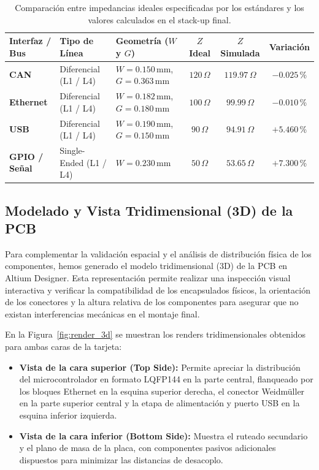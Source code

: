 \documentclass[12pt,a4paper]{article}
\begin{document}
\begin{table}[H]
\centering
\small
\begin{tabularx}{\textwidth}{|l|l|X|c|c|c|}
\hline
\textbf{Interfaz / Bus} & \textbf{Tipo de Línea} & \textbf{Geometría ($W$ y $G$)} & \textbf{$Z$ Ideal} & \textbf{$Z$ Simulada} & \textbf{Variación} \\ \hline
\textbf{CAN} & Diferencial (L1 / L4) & $W=0.150\,\text{mm}$, $G=0.363\,\text{mm}$ & $120\,\Omega$ & $119.97\,\Omega$ & $-0.025$\,\% \\ \hline
\textbf{Ethernet} & Diferencial (L1 / L4) & $W=0.182\,\text{mm}$, $G=0.180\,\text{mm}$ & $100\,\Omega$ & $99.99\,\Omega$ & $-0.010$\,\% \\ \hline
\textbf{USB} & Diferencial (L1 / L4) & $W=0.190\,\text{mm}$, $G=0.150\,\text{mm}$ & $90\,\Omega$ & $94.91\,\Omega$ & $+5.460$\,\% \\ \hline
\textbf{GPIO / Señal} & Single-Ended (L1 / L4) & $W=0.230\,\text{mm}$ & $50\,\Omega$ & $53.65\,\Omega$ & $+7.300$\,\% \\ \hline
\end{tabularx}
\caption{Comparación entre impedancias ideales especificadas por los estándares y los valores calculados en el stack-up final.}
\label{tab:impedancias}
\end{table}

\subsection{Modelado y Vista Tridimensional (3D) de la PCB}

Para complementar la validación espacial y el análisis de distribución física de los componentes, hemos generado el modelo tridimensional (3D) de la PCB en Altium Designer. Esta representación permite realizar una inspección visual interactiva y verificar la compatibilidad de los encapsulados físicos, la orientación de los conectores y la altura relativa de los componentes para asegurar que no existan interferencias mecánicas en el montaje final.

En la Figura~\ref{fig:render_3d} se muestran los renders tridimensionales obtenidos para ambas caras de la tarjeta:
\begin{itemize}
    \item \textbf{Vista de la cara superior (Top Side):} Permite apreciar la distribución del microcontrolador en formato LQFP144 en la parte central, flanqueado por los bloques Ethernet en la esquina superior derecha, el conector Weidmüller en la parte superior central y la etapa de alimentación y puerto USB en la esquina inferior izquierda.
    \item \textbf{Vista de la cara inferior (Bottom Side):} Muestra el ruteado secundario y el plano de masa de la placa, con componentes pasivos adicionales dispuestos para minimizar las distancias de desacoplo.
\end{itemize}
\end{document}
